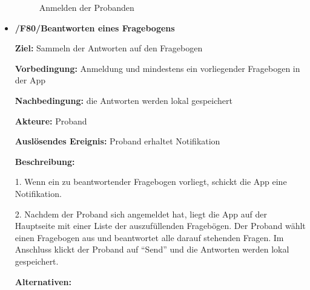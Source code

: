 \documentclass[a4paper]{scrreprt}
\begin{document}
\begin{itemize}
\begin{figure}[ht]
                    \caption{Anmelden der \gls{Proband}en}
                \end{figure}


            \item \textbf{/F80/Beantworten eines Fragebogens}

                \par \textbf{Ziel: }Sammeln der Antworten auf den Fragebogen
                \par \textbf{Vorbedingung: }Anmeldung und mindestens ein vorliegender Fragebogen in der App
                \par \textbf{Nachbedingung: }die Antworten werden lokal gespeichert
                \par \textbf{Akteure: }\gls{Proband}
                \par \textbf{Auslösendes Ereignis: }\gls{Proband} erhaltet Notifikation
                \par \textbf{Beschreibung: }
                \par 1. Wenn ein zu beantwortender Fragebogen vorliegt, schickt die App eine Notifikation.
                \par 2. Nachdem der \gls{Proband} sich angemeldet hat, liegt die App auf der Hauptseite mit einer Liste der auszufüllenden Fragebögen. Der \gls{Proband} wählt einen Fragebogen aus und beantwortet alle darauf stehenden Fragen. Im Anschluss klickt der \gls{Proband} auf ``Send'' und die Antworten werden lokal gespeichert.
                \par \textbf{Alternativen: }
                \begin{figure}[ht]
                    \centering

\end{figure}
\end{itemize}
\end{document}
